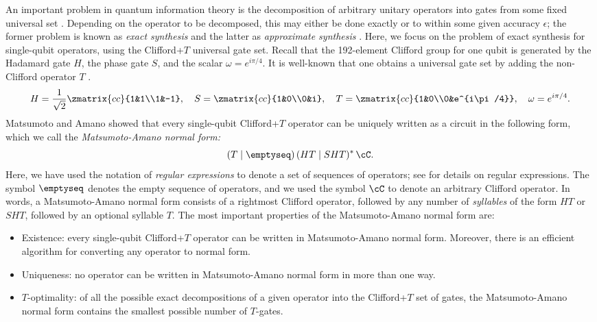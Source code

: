 \documentclass{article}
\begin{document}
An important problem in quantum information theory is the
decomposition of arbitrary unitary operators into gates from some
fixed universal set {\cite{Nielsen-Chuang}}. Depending on the operator
to be decomposed, this may either be done exactly or to within some
given accuracy $\epsilon$; the former problem is known as {\em exact
  synthesis} and the latter as {\em approximate synthesis}
{\cite{Kliuchnikov-etal}}. Here, we focus on the problem of exact
synthesis for single-qubit operators, using the Clifford+$T$ universal
gate set. Recall that the 192-element Clifford group for one qubit is
generated by the Hadamard gate $H$, the phase gate $S$, and the scalar
$\omega=e^{i\pi/4}$. It is well-known that one obtains a universal
gate set by adding the non-Clifford operator $T$ {\cite{Nielsen-Chuang}}.
\begin{equation}\label{eqn-generators}
  H = \frac{1}{\sqrt{2}}\zmatrix{cc}{1&1\\1&-1}, \quad
  S = \zmatrix{cc}{1&0\\0&i}, \quad
  T = \zmatrix{cc}{1&0\\0&e^{i\pi/4}}, \quad
  \omega=e^{i\pi/4}.
\end{equation}
Matsumoto and Amano {\cite{MA08}} showed that every single-qubit
Clifford+$T$ operator can be uniquely written as a circuit in the following form,
which we call the {\em Matsumoto-Amano normal form:}
\begin{equation}\label{eqn-ma}
 (T\mid\emptyseq)\,(HT\mid SHT)^*\,{\cC}.
\end{equation}
Here, we have used the notation of {\em regular expressions} to denote
a set of sequences of operators; see {\cite{regexp}} for details on
regular expressions. The symbol $\emptyseq$ denotes the empty sequence
of operators, and we used the symbol $\cC$ to denote an arbitrary Clifford
operator.  In words, a Matsumoto-Amano normal form consists of a
rightmost Clifford operator, followed by any number of {\em syllables}
of the form $HT$ or $SHT$, followed by an optional syllable $T$. The most
important properties of the Matsumoto-Amano normal form are:
\begin{itemize}
\item Existence: every single-qubit Clifford+$T$ operator can be
  written in Matsumoto-Amano normal form. Moreover, there is an
  efficient algorithm for converting any operator to normal form.

\item Uniqueness: no operator can be written in Matsumoto-Amano normal
  form in more than one way.

\item $T$-optimality: of all the possible exact decompositions of a
  given operator into the Clifford+$T$ set of gates, the
  Matsumoto-Amano normal form contains the smallest possible number of
  $T$-gates.
\end{itemize}
\end{document}
